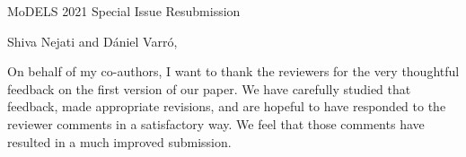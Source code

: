 \documentclass[10pt]{byu-cs}
\begin{document}
\pagestyle{headings}

\signature{Eric G Mercer\\
           Associate Professor}

\begin{letter}{MoDELS 2021 Special Issue Resubmission}

\date{\today}

\opening{Shiva Nejati and D\'{a}niel Varr\'{o},}

On behalf of my co-authors, I want to thank the reviewers for the very thoughtful feedback on the first version of our paper.
We have carefully studied that feedback, made appropriate revisions, and are hopeful to have responded to the reviewer comments in a satisfactory way.
We feel that those comments have resulted in a much improved submission.


\end{letter}
\end{document}
